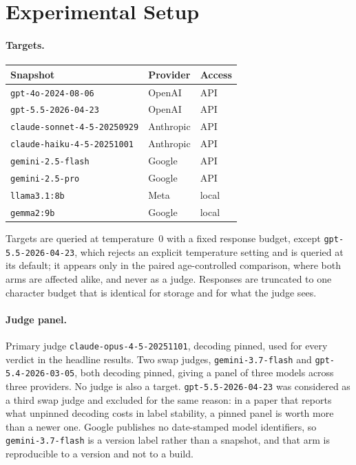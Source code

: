 \documentclass{article}
\begin{document}
\section{Experimental Setup}
\label{app:setup}

\paragraph{Targets.}
\begin{center}
\small
\begin{tabular}{@{}lll@{}}
\toprule
\textbf{Snapshot} & \textbf{Provider} & \textbf{Access} \\
\midrule
\texttt{gpt-4o-2024-08-06} & OpenAI & API \\
\texttt{gpt-5.5-2026-04-23} & OpenAI & API \\
\texttt{claude-sonnet-4-5-20250929} & Anthropic & API \\
\texttt{claude-haiku-4-5-20251001} & Anthropic & API \\
\texttt{gemini-2.5-flash} & Google & API \\
\texttt{gemini-2.5-pro} & Google & API \\
\texttt{llama3.1:8b} & Meta & local \\
\texttt{gemma2:9b} & Google & local \\
\bottomrule
\end{tabular}
\end{center}
Targets are queried at temperature~0 with a fixed response budget, except
\texttt{gpt-5.5-2026-04-23}, which rejects an explicit temperature setting and is queried at its
default; it appears only in the paired age-controlled comparison, where both arms are affected
alike, and never as a judge. Responses are truncated
to one character budget that is identical for storage and for what the judge sees.

\paragraph{Judge panel.}
Primary judge \texttt{claude-opus-4-5-20251101}, decoding pinned, used for every verdict in the
headline results. Two swap judges, \texttt{gemini-3.7-flash} and \texttt{gpt-5.4-2026-03-05},
both decoding pinned, giving a panel of three models across three providers. No judge is also a
target. \texttt{gpt-5.5-2026-04-23} was considered as a third swap judge and excluded for the same
reason: in a paper that reports what unpinned decoding costs in
label stability, a pinned panel is worth more than a newer one. Google publishes no
date-stamped model identifiers, so \texttt{gemini-3.7-flash} is a version label rather than a
snapshot, and that arm is reproducible to a version and not to a build.
\end{document}
